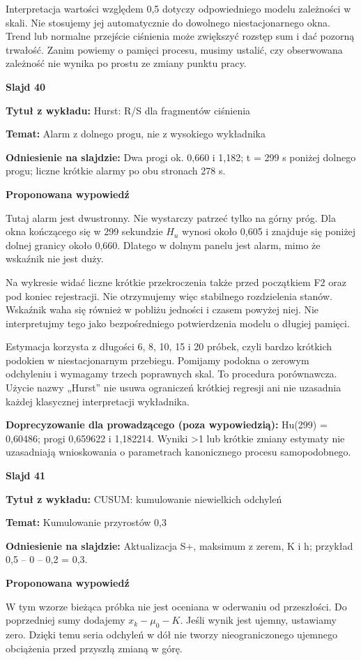 \documentclass[a4paper,11pt]{article}
\newcommand{\NumerSlajdu}{1}
\newcommand{\Komentarz}[3]{%
  \gdef\NumerSlajdu{#1}%
  {\Large\bfseries Slajd #1\par}\smallskip
  \textbf{Tytuł z wykładu:} #2\par
  \textbf{Temat:} #3\par\medskip
}
\begin{document}
Interpretacja wartości względem 0,5 dotyczy odpowiedniego modelu zależności w skali. Nie stosujemy jej automatycznie do dowolnego niestacjonarnego okna. Trend lub normalne przejście ciśnienia może zwiększyć rozstęp sum i dać pozorną trwałość. Zanim powiemy o pamięci procesu, musimy ustalić, czy obserwowana zależność nie wynika po prostu ze zmiany punktu pracy.
\clearpage

\Komentarz{40}{Hurst: R/S dla fragmentów ciśnienia}{Alarm z dolnego progu, nie z wysokiego wykładnika}
{\small\color{black!65}\textbf{Odniesienie na slajdzie:} Dwa progi ok. 0,660 i 1,182; t = 299 s poniżej dolnego progu; liczne krótkie alarmy po obu stronach 278 s.\par}
\medskip
\textbf{Proponowana wypowiedź}\par
Tutaj alarm jest dwustronny. Nie wystarczy patrzeć tylko na górny próg. Dla okna kończącego się w 299 sekundzie $H_u$ wynosi około 0,605 i znajduje się poniżej dolnej granicy około 0,660. Dlatego w dolnym panelu jest alarm, mimo że wskaźnik nie jest duży.

Na wykresie widać liczne krótkie przekroczenia także przed początkiem F2 oraz pod koniec rejestracji. Nie otrzymujemy więc stabilnego rozdzielenia stanów. Wskaźnik waha się również w pobliżu jedności i czasem powyżej niej. Nie interpretujmy tego jako bezpośredniego potwierdzenia modelu o długiej pamięci.

Estymacja korzysta z długości 6, 8, 10, 15 i 20 próbek, czyli bardzo krótkich podokien w niestacjonarnym przebiegu. Pomijamy podokna o zerowym odchyleniu i wymagamy trzech poprawnych skal. To procedura porównawcza. Użycie nazwy „Hurst” nie usuwa ograniczeń krótkiej regresji ani nie uzasadnia każdej klasycznej interpretacji wykładnika.

{\small\color{black!65}\textbf{Doprecyzowanie dla prowadzącego (poza wypowiedzią):} Hu(299) = 0,60486; progi 0,659622 i 1,182214. Wyniki >1 lub krótkie zmiany estymaty nie uzasadniają wnioskowania o parametrach kanonicznego procesu samopodobnego.\par}
\clearpage

\Komentarz{41}{CUSUM: kumulowanie niewielkich odchyleń}{Kumulowanie przyrostów 0,3}
{\small\color{black!65}\textbf{Odniesienie na slajdzie:} Aktualizacja S+, maksimum z zerem, K i h; przykład 0,5 -- 0 -- 0,2 = 0,3.\par}
\medskip
\textbf{Proponowana wypowiedź}\par
W tym wzorze bieżąca próbka nie jest oceniana w oderwaniu od przeszłości. Do poprzedniej sumy dodajemy $x_k-\mu_0-K$. Jeśli wynik jest ujemny, ustawiamy zero. Dzięki temu seria odchyleń w dół nie tworzy nieograniczonego ujemnego obciążenia przed przyszłą zmianą w górę.
\end{document}
